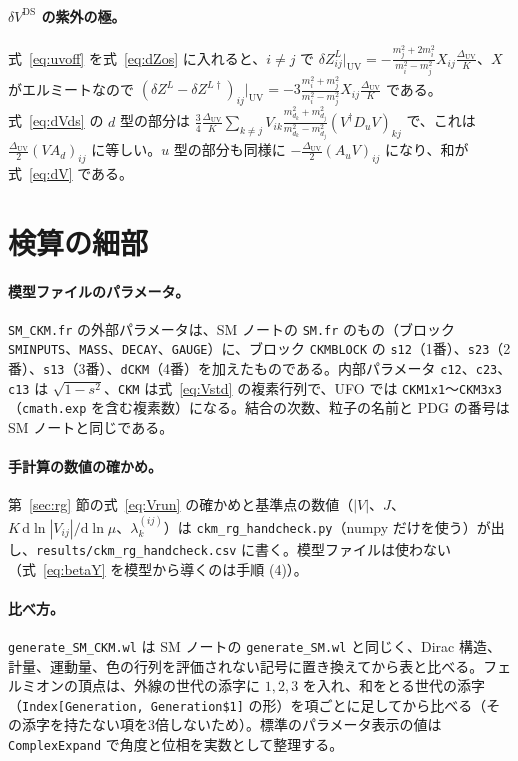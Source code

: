 \documentclass[a4paper,10pt]{ltjsarticle}
\newcommand{\dd}{\mathrm{d}}
\newcommand{\DUV}{\Delta_{\mathrm{UV}}}
\begin{document}
\paragraph{$\delta V^{\mathrm{DS}}$ の紫外の極。}式~\eqref{eq:uvoff} を式~\eqref{eq:dZos} に入れると、$i\ne j$ で $\delta Z^L_{ij}|_{\mathrm{UV}}=-\frac{m_j^2+2m_i^2}{m_i^2-m_j^2}X_{ij}\frac{\DUV}K$、$X$ がエルミートなので $(\delta Z^L-\delta Z^{L\dagger})_{ij}|_{\mathrm{UV}}=-3\frac{m_i^2+m_j^2}{m_i^2-m_j^2}X_{ij}\frac{\DUV}K$ である。式~\eqref{eq:dVds} の $d$ 型の部分は $\frac34\frac{\DUV}K\sum_{k\ne j}V_{ik}\frac{m_{d_k}^2+m_{d_j}^2}{m_{d_k}^2-m_{d_j}^2}(V^\dagger D_uV)_{kj}$ で、これは $\frac{\DUV}2(VA_d)_{ij}$ に等しい。$u$ 型の部分も同様に $-\frac{\DUV}2(A_uV)_{ij}$ になり、和が式~\eqref{eq:dV} である。

\section{検算の細部}\label{app:details}

\paragraph{模型ファイルのパラメータ。}\texttt{SM\_CKM.fr} の外部パラメータは、SM ノートの \texttt{SM.fr} のもの（ブロック \texttt{SMINPUTS}、\texttt{MASS}、\texttt{DECAY}、\texttt{GAUGE}）に、ブロック \texttt{CKMBLOCK} の \texttt{s12}（1番）、\texttt{s23}（2番）、\texttt{s13}（3番）、\texttt{dCKM}（4番）を加えたものである。内部パラメータ \texttt{c12}、\texttt{c23}、\texttt{c13} は $\sqrt{1-s^2}$、\texttt{CKM} は式~\eqref{eq:Vstd} の複素行列で、UFO では \texttt{CKM1x1}〜\texttt{CKM3x3}（\texttt{cmath.exp} を含む複素数）になる。結合の次数、粒子の名前と PDG の番号は SM ノートと同じである。

\paragraph{手計算の数値の確かめ。}第~\ref{sec:rg} 節の式~\eqref{eq:Vrun} の確かめと基準点の数値（$|V|$、$J$、$K\,\dd\ln|V_{ij}|/\dd\ln\mu$、$\lambda^{(ij)}_k$）は \texttt{ckm\_rg\_handcheck.py}（numpy だけを使う）が出し、\texttt{results/ckm\_rg\_handcheck.csv} に書く。模型ファイルは使わない（式~\eqref{eq:betaY} を模型から導くのは手順 (4)）。

\paragraph{比べ方。}\texttt{generate\_SM\_CKM.wl} は SM ノートの \texttt{generate\_SM.wl} と同じく、Dirac 構造、計量、運動量、色の行列を評価されない記号に置き換えてから表と比べる。フェルミオンの頂点は、外線の世代の添字に $1,2,3$ を入れ、和をとる世代の添字（\texttt{Index[Generation, Generation\$1]} の形）を項ごとに足してから比べる（その添字を持たない項を3倍しないため）。標準のパラメータ表示の値は \texttt{ComplexExpand} で角度と位相を実数として整理する。
\end{document}
